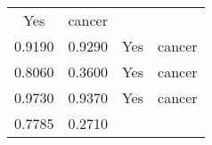 \documentclass[12pt,]{article}
\begin{document}
\begin{longtable}[]{@{}cccc@{}}
\begin{minipage}[t]{0.22\columnwidth}
Yes\strut
\end{minipage} & \begin{minipage}[t]{0.16\columnwidth}\centering\strut
cancer\strut
\end{minipage}\tabularnewline
\begin{minipage}[t]{0.24\columnwidth}\centering\strut
0.9190\strut
\end{minipage} & \begin{minipage}[t]{0.26\columnwidth}\centering\strut
0.9290\strut
\end{minipage} & \begin{minipage}[t]{0.22\columnwidth}\centering\strut
Yes\strut
\end{minipage} & \begin{minipage}[t]{0.16\columnwidth}\centering\strut
cancer\strut
\end{minipage}\tabularnewline
\begin{minipage}[t]{0.24\columnwidth}\centering\strut
0.8060\strut
\end{minipage} & \begin{minipage}[t]{0.26\columnwidth}\centering\strut
0.3600\strut
\end{minipage} & \begin{minipage}[t]{0.22\columnwidth}\centering\strut
Yes\strut
\end{minipage} & \begin{minipage}[t]{0.16\columnwidth}\centering\strut
cancer\strut
\end{minipage}\tabularnewline
\begin{minipage}[t]{0.24\columnwidth}\centering\strut
0.9730\strut
\end{minipage} & \begin{minipage}[t]{0.26\columnwidth}\centering\strut
0.9370\strut
\end{minipage} & \begin{minipage}[t]{0.22\columnwidth}\centering\strut
Yes\strut
\end{minipage} & \begin{minipage}[t]{0.16\columnwidth}\centering\strut
cancer\strut
\end{minipage}\tabularnewline
\begin{minipage}[t]{0.24\columnwidth}\centering\strut
0.7785\strut
\end{minipage} & \begin{minipage}[t]{0.26\columnwidth}\centering\strut
0.2710\strut
\end{minipage} & \begin{minipage}[t]{0.22\columnwidth}\centering\strut

\end{minipage}
\end{longtable}
\end{document}
